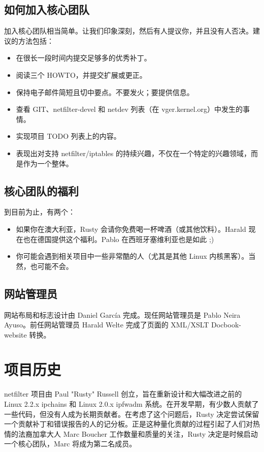 \documentclass[12pt,UTF8]{ctexbook}
\begin{document}
\subsection{如何加入核心团队}
加入核心团队相当简单。让我们印象深刻，然后有人提议你，并且没有人否决。建议的方法包括：
\begin{itemize}
  \item 在很长一段时间内提交足够多的优秀补丁。
  \item 阅读三个 HOWTO，并提交扩展或更正。
  \item 保持电子邮件简短且切中要点。不要发火；要提供信息。
  \item 查看 GIT、netfilter-devel 和 netdev 列表（在 vger.kernel.org）中发生的事情。
  \item 实现项目 TODO 列表上的内容。
  \item 表现出对支持 netfilter/iptables 的持续兴趣，不仅在一个特定的兴趣领域，而是作为一个整体。
\end{itemize}

\subsection{核心团队的福利}
到目前为止，有两个：
\begin{itemize}
  \item 如果你在澳大利亚，Rusty 会请你免费喝一杯啤酒（或其他饮料）。Harald 现在也在德国提供这个福利。Pablo 在西班牙塞维利亚也是如此 ;)
  \item 你可能会遇到相关项目中一些非常酷的人（尤其是其他 Linux 内核黑客）。当然，也可能不会。
\end{itemize}

\subsection{网站管理员}
网站布局和标志设计由 Daniel García 完成。现任网站管理员是 Pablo Neira Ayuso。前任网站管理员 Harald Welte 完成了页面的 XML/XSLT Docbook-website 转换。

\section{项目历史}
netfilter 项目由 Paul "Rusty" Russell 创立，旨在重新设计和大幅改进之前的 Linux 2.2.x ipchains 和 Linux 2.0.x ipfwadm 系统。在开发早期，有少数人贡献了一些代码，但没有人成为长期贡献者。在考虑了这个问题后，Rusty 决定尝试保留一个贡献补丁和错误报告的人的记分板。正是这种量化贡献的过程引起了人们对热情的法裔加拿大人 Marc Boucher 工作数量和质量的关注，Rusty 决定是时候启动一个核心团队，Marc 将成为第二名成员。
\end{document}
